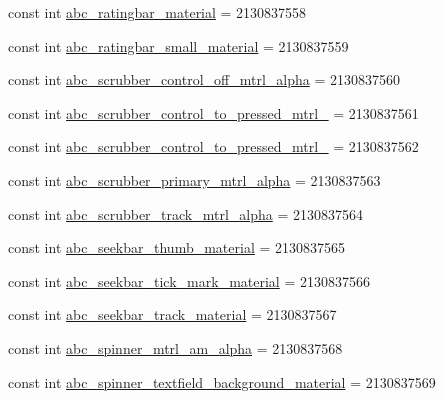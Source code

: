 \begin{DoxyCompactItemize}
\item 
const int \mbox{\hyperlink{class_f_w_p_s___app_1_1_droid_1_1_resource_1_1_drawable_a8b3d51c8fe86b6fa7de7ef705c332b2d}{abc\+\_\+ratingbar\+\_\+material}} = 2130837558
\item 
const int \mbox{\hyperlink{class_f_w_p_s___app_1_1_droid_1_1_resource_1_1_drawable_a4d89be6c34d560fac3e360d220c7c16d}{abc\+\_\+ratingbar\+\_\+small\+\_\+material}} = 2130837559
\item 
const int \mbox{\hyperlink{class_f_w_p_s___app_1_1_droid_1_1_resource_1_1_drawable_adf27fc0dc8b6334a91d13590b474fa81}{abc\+\_\+scrubber\+\_\+control\+\_\+off\+\_\+mtrl\+\_\+alpha}} = 2130837560
\item 
const int \mbox{\hyperlink{class_f_w_p_s___app_1_1_droid_1_1_resource_1_1_drawable_adb2a670bd9de7b002bdc23195858b9d6}{abc\+\_\+scrubber\+\_\+control\+\_\+to\+\_\+pressed\+\_\+mtrl\+\_}} = 2130837561
\item 
const int \mbox{\hyperlink{class_f_w_p_s___app_1_1_droid_1_1_resource_1_1_drawable_a9c63d0887dfa2c36ae0577ab52d4e8dd}{abc\+\_\+scrubber\+\_\+control\+\_\+to\+\_\+pressed\+\_\+mtrl\+\_}} = 2130837562
\item 
const int \mbox{\hyperlink{class_f_w_p_s___app_1_1_droid_1_1_resource_1_1_drawable_af93dcbdafb3ac885411571aa3631c3c7}{abc\+\_\+scrubber\+\_\+primary\+\_\+mtrl\+\_\+alpha}} = 2130837563
\item 
const int \mbox{\hyperlink{class_f_w_p_s___app_1_1_droid_1_1_resource_1_1_drawable_ac91c3e2c28acf789a40e57608647dd6a}{abc\+\_\+scrubber\+\_\+track\+\_\+mtrl\+\_\+alpha}} = 2130837564
\item 
const int \mbox{\hyperlink{class_f_w_p_s___app_1_1_droid_1_1_resource_1_1_drawable_ae7ead1e53655bf383b9ea7a0a1946b71}{abc\+\_\+seekbar\+\_\+thumb\+\_\+material}} = 2130837565
\item 
const int \mbox{\hyperlink{class_f_w_p_s___app_1_1_droid_1_1_resource_1_1_drawable_aec60d469d29547775068dbd398b1a33d}{abc\+\_\+seekbar\+\_\+tick\+\_\+mark\+\_\+material}} = 2130837566
\item 
const int \mbox{\hyperlink{class_f_w_p_s___app_1_1_droid_1_1_resource_1_1_drawable_af1c403639db1166eec9bd6e6c313b12c}{abc\+\_\+seekbar\+\_\+track\+\_\+material}} = 2130837567
\item 
const int \mbox{\hyperlink{class_f_w_p_s___app_1_1_droid_1_1_resource_1_1_drawable_ad096c5b771eedf9379d4efbf700e52f9}{abc\+\_\+spinner\+\_\+mtrl\+\_\+am\+\_\+alpha}} = 2130837568
\item 
const int \mbox{\hyperlink{class_f_w_p_s___app_1_1_droid_1_1_resource_1_1_drawable_a8cd11dc8fc1bdf8053c9c5be7839e744}{abc\+\_\+spinner\+\_\+textfield\+\_\+background\+\_\+material}} = 2130837569

\end{DoxyCompactItemize}
